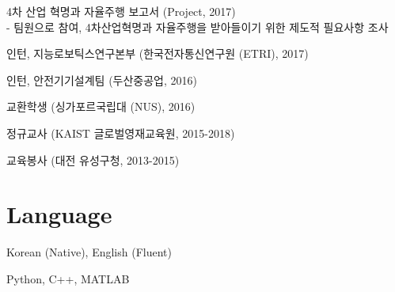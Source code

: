 \documentclass[margin]{res}
\begin{document}
\begin{resume}
		\par	4차 산업 혁명과 자율주행 보고서 (Project, 2017)
		\\-	팀원으로 참여, 4차산업혁명과 자율주행을 받아들이기 위한 제도적 필요사항 조사
		\par	인턴, 지능로보틱스연구본부 (한국전자통신연구원 (ETRI), 2017)
		\par	인턴, 안전기기설계팀 (두산중공업, 2016)
		\par	교환학생 (싱가포르국립대 (NUS), 2016)
		\par	정규교사 (KAIST 글로벌영재교육원, 2015-2018)
		\par	교육봉사 (대전 유성구청, 2013-2015)
		
		
		\section{Language}
		\par Korean (Native), English (Fluent)
		\par Python, C++, MATLAB
				
	\end{resume}
\end{document}
